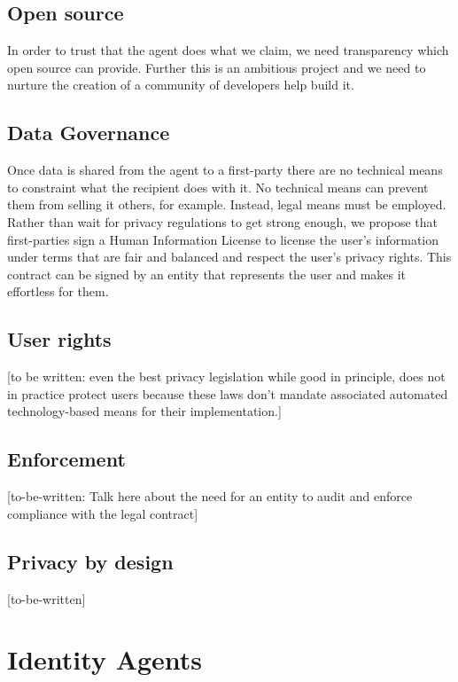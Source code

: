 \documentclass[11pt, oneside]{article}   	%
\begin{document}
\subsection{Open source}

In order to trust that the agent does what we claim, we need transparency which open source can provide. Further this is an ambitious project and we need to nurture the creation of a community of developers help build it.

\subsection{Data Governance}

Once data is shared from the agent to a first-party there are no technical means to constraint what the recipient does with it. No technical means can prevent them from selling it others, for example. Instead, legal means must be employed. Rather than wait for privacy regulations to get strong enough, we propose that first-parties sign a Human Information License to license the user's information under terms that are fair and balanced and respect the user's privacy rights. This contract can be signed by an entity that represents the user and makes it effortless for them.

\subsection{User rights}

[to be written: even the best privacy legislation while good in principle, does not in practice protect users because these laws don't mandate associated automated technology-based means for their implementation.]

\subsection{Enforcement}

[to-be-written: Talk here about the need for an entity to audit and enforce compliance with the legal contract]

\subsection{Privacy by design}
[to-be-written]

\section{Identity Agents} 
\end{document}
